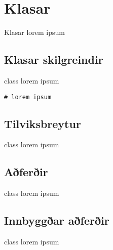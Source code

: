 
\chapter{Klasar}\label{k:klasar}
Klasar lorem ipsum

\section{Klasar skilgreindir}\label{uk:klasar-skilgreindir}
class lorem ipsum

\begin{lstlisting}[caption=Klasar skilgreindir, label=lst:klasar-skilgreindir]
# lorem ipsum
\end{lstlisting}

\section{Tilviksbreytur}\label{uk:klasar-tilviksbreytur}
class lorem ipsum

\section{Aðferðir}\label{uk:klasar-aðferðir}
class lorem ipsum

\section{Innbyggðar aðferðir}\label{uk:klasar-innbyggðar-aðferðir}
class lorem ipsum